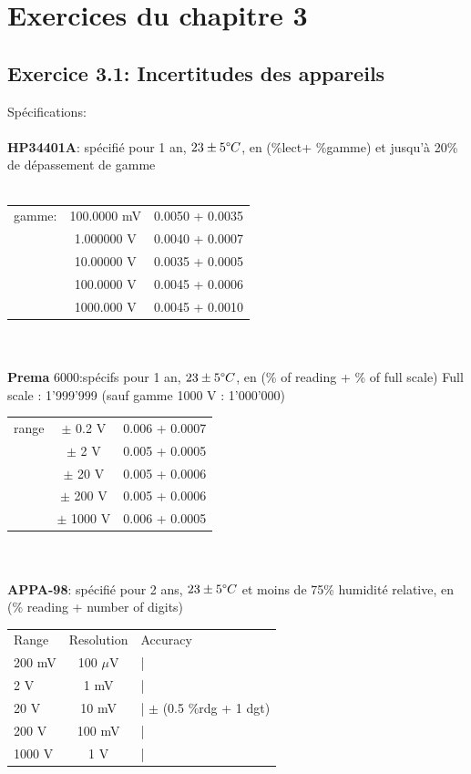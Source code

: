 \documentclass[main.tex]{subfiles}
\begin{document}
\fi
\iftrue

\pagebreak
\newpage


\section{Exercices du chapitre 3}

\subsection*{Exercice 3.1: Incertitudes des appareils }
Spécifications:\\
\\
\textbf{HP34401A}: spécifié pour 1 an, $23 \pm 5 \degree C$, en (\%lect+ \%gamme) et jusqu'à 20\% de dépassement de gamme\\
\\
\begin{tabular}{l c c}
    \hline
    gamme: & 100.0000 mV & 0.0050 + 0.0035 \\
           & 1.000000 V  & 0.0040 + 0.0007 \\
           & 10.00000 V  & 0.0035 + 0.0005 \\
           & 100.0000 V  & 0.0045 + 0.0006 \\
           & 1000.000 V  & 0.0045 + 0.0010 \\
    \hline
\end{tabular}
\\
\\
\textbf{Prema} 6000:spécifs pour 1 an, $23 \pm 5 \degree C$, en (\% of reading + \% of full scale)
Full scale : 1'999'999 (sauf gamme 1000 V : 1'000'000)
\\
\begin{tabular}{lcc}
    \hline
    range & $\pm$ 0.2 V  & 0.006 + 0.0007 \\
          & $\pm$ 2 V    & 0.005 + 0.0005 \\
          & $\pm$ 20 V   & 0.005 + 0.0006 \\
          & $\pm$ 200 V  & 0.005 + 0.0006 \\
          & $\pm$ 1000 V & 0.006 + 0.0005 \\
    \hline
\end{tabular}
\\
\\
\textbf{APPA-98}: spécifié pour 2 ans, $23 \pm 5 \degree C$ et moins de 75\% humidité relative, en (\% reading + number of digits)
\\
\begin{tabular}{lcl}
    \hline
    Range  & Resolution & Accuracy                     \\
    200 mV & 100 $\mu$V & |                            \\
    2 V    & 1 mV       & |                            \\
    20 V   & 10 mV      & |  $\pm$ (0.5 \%rdg + 1 dgt) \\
    200 V  & 100 mV     & |                            \\
    1000 V & 1 V        & |                            \\
    \hline
\end{tabular}
\\
\end{document}
